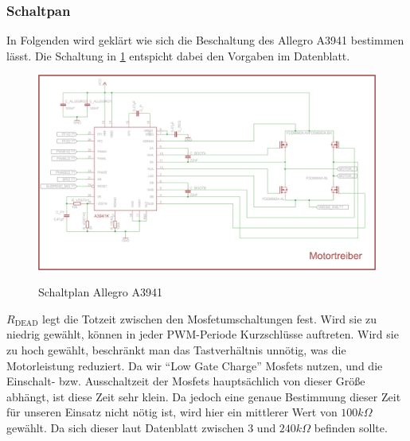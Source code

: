 \subsubsection{Schaltpan}

In Folgenden wird geklärt wie sich die Beschaltung des Allegro A3941 bestimmen lässt. Die Schaltung in \cref{fig:schalt:allegro} entspicht dabei den Vorgaben im Datenblatt.

\begin{figure}[H]
\centering
\includegraphics[width=.9\textwidth]{motortreiber.png}\\
\caption{Schaltplan Allegro A3941}%
\label{fig:schalt:allegro}
\end{figure}

$R_{\text{DEAD}}$ legt die Totzeit zwischen den Mosfetumschaltungen fest. Wird sie zu niedrig gewählt, können in jeder PWM-Periode Kurzschlüsse auftreten. Wird sie zu hoch
gewählt, beschränkt man das Tastverhältnis unnötig, was die Motorleistung reduziert. Da wir ``Low Gate Charge'' Mosfets nutzen, und die Einschalt- bzw. Ausschaltzeit
der Mosfets hauptsächlich von dieser Größe abhängt, ist diese Zeit sehr klein. Da jedoch eine genaue Bestimmung dieser Zeit für unseren Einsatz nicht nötig ist,
wird hier ein mittlerer Wert von $100k\Omega$ gewählt. Da sich dieser laut Datenblatt zwischen 3 und $240k\Omega$ befinden sollte.\\


%
% 
% 
% 



